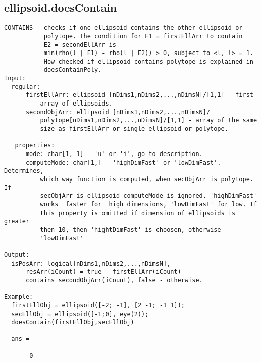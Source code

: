 \subsection{\texorpdfstring{ellipsoid.doesContain}{doesContain}}\label{method:ellipsoid.doesContain}
\begin{verbatim}
CONTAINS - checks if one ellipsoid contains the other ellipsoid or
           polytope. The condition for E1 = firstEllArr to contain
           E2 = secondEllArr is
           min(rho(l | E1) - rho(l | E2)) > 0, subject to <l, l> = 1.
           How checked if ellipsoid contains polytope is explained in
           doesContainPoly.
Input:
  regular:
      firstEllArr: ellipsoid [nDims1,nDims2,...,nDimsN]/[1,1] - first
          array of ellipsoids.
      secondObjArr: ellipsoid [nDims1,nDims2,...,nDimsN]/
          polytope[nDims1,nDims2,...,nDimsN]/[1,1] - array of the same
          size as firstEllArr or single ellipsoid or polytope.

   properties:
      mode: char[1, 1] - 'u' or 'i', go to description.
      computeMode: char[1,] - 'highDimFast' or 'lowDimFast'. Determines,
          which way function is computed, when secObjArr is polytope. If
          secObjArr is ellipsoid computeMode is ignored. 'highDimFast'
          works  faster for  high dimensions, 'lowDimFast' for low. If
          this property is omitted if dimension of ellipsoids is greater
          then 10, then 'hightDimFast' is choosen, otherwise -
          'lowDimFast'

Output:
  isPosArr: logical[nDims1,nDims2,...,nDimsN],
      resArr(iCount) = true - firstEllArr(iCount)
      contains secondObjArr(iCount), false - otherwise.

Example:
  firstEllObj = ellipsoid([-2; -1], [2 -1; -1 1]);
  secEllObj = ellipsoid([-1;0], eye(2));
  doesContain(firstEllObj,secEllObj)

  ans =

       0
\end{verbatim}
